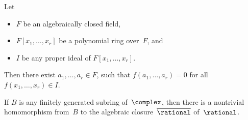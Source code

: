 \begin{prop} \label{Nullstellensatz}
 Let 
 \begin{itemize}
 \item $F$ be an algebraically closed field, 
 \item $F[x_1,\ldots,x_r]$ be a polynomial ring over~$F$, and
 \item $I$ be any proper ideal of $F[x_1,\ldots,x_r]$.
 \end{itemize}
 Then there exist $a_1,\ldots,a_r \in F$, such that
 $f(a_1,\ldots,a_r) = 0$ for all $f(x_1,\ldots,x_r) \in I$.
 \end{prop}


\begin{cor} \label{Nullstellensatz-ringhomo}
 If $B$ is any finitely generated subring of\/~$\complex$, then
there is a nontrivial homomorphism from~$B$ to the
algebraic closure\/~$\overline{\rational}$ of\/~$\rational$.
 \end{cor}


%
%
 
